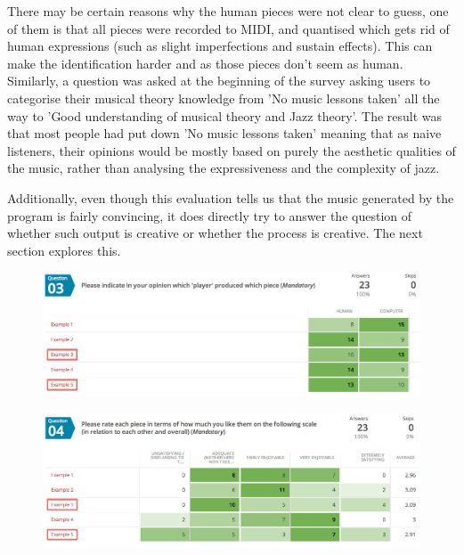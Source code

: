 \documentclass[pdftex,12pt,a4paper]{report}
\begin{document}
There may be certain reasons why the human pieces were not clear to guess, one of them is that all pieces were recorded to MIDI, and quantised which gets rid of human expressions (such as slight imperfections and  sustain effects). This can make the identification harder and as those pieces don't seem as human. Similarly, a question was asked at the beginning of the survey asking users to categorise their musical theory knowledge from 'No music lessons taken' all the way to 'Good understanding of musical theory and Jazz theory'. The result was that most people had put down 'No music lessons taken' meaning that as naive listeners, their opinions would be mostly based on purely the aesthetic qualities of the music, rather than analysing the expressiveness and the complexity of jazz.

Additionally, even though this evaluation tells us that the music generated by the program is fairly convincing, it does directly try to answer the question of whether such output is creative or whether the process is creative. The next section explores this.


\begin{figure}[here]
  \centering
  \includegraphics[scale=0.40]{figure/identification.png}
  \label{fig:identification}
\end{figure}

\begin{figure}[here]
  \centering
  \includegraphics[scale=0.40]{figure/opinion.png}
  \label{fig:opinion}
\end{figure}
\end{document}
